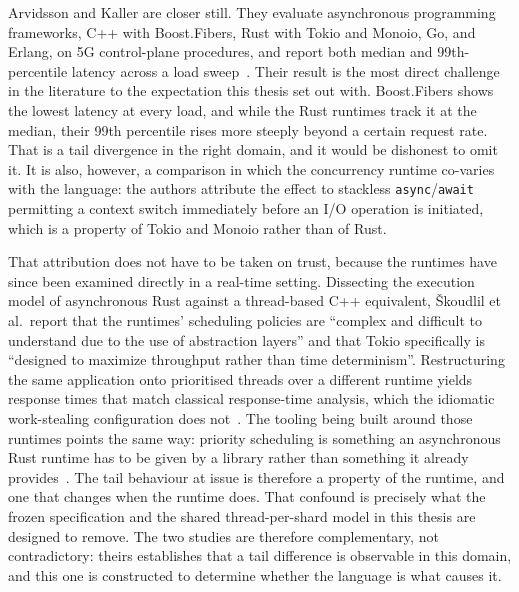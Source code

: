 \documentclass[english,twoside,openright,a4paper,censored,csm,software-track-2020]{HYthesisML}
\begin{document}
Arvidsson and Kaller are closer still. They evaluate asynchronous programming frameworks, C++
with Boost.Fibers, Rust with Tokio and Monoio, Go, and Erlang, on 5G control-plane procedures,
and report both median and 99th-percentile latency across a load
sweep~\cite{arvidsson2025async}. Their result is the most direct challenge in the literature to
the expectation this thesis set out with. Boost.Fibers shows the lowest latency at every load,
and while the Rust runtimes track it at the median, their 99th percentile rises more steeply
beyond a certain request rate. That is a tail divergence in the right domain, and it would be
dishonest to omit it. It is also, however, a comparison in which the concurrency runtime
co-varies with the language: the authors attribute the effect to stackless
\texttt{async}/\texttt{await} permitting a context switch immediately before an I/O operation is
initiated, which is a property of Tokio and Monoio rather than of Rust.

That attribution does not have to be taken on trust, because the runtimes have since been
examined directly in a real-time setting. Dissecting the execution model of asynchronous Rust
against a thread-based C++ equivalent, \v{S}koudlil et al.\ report that the
runtimes' scheduling policies are ``complex and difficult to understand due to the use of
abstraction layers'' and that Tokio specifically is ``designed to maximize throughput rather than
time determinism''. Restructuring the same application onto prioritised threads over a different
runtime yields response times that match classical response-time analysis, which the idiomatic
work-stealing configuration does not~\cite{skoudlil2025asyncrust}. The tooling being built around
those runtimes points the same way: priority scheduling is something an asynchronous Rust runtime
has to be given by a library rather than something it already
provides~\cite{zhuang2026flowprioritize}. The tail behaviour at issue is
therefore a property of the runtime, and one that changes when the runtime does. That confound is
precisely what the frozen specification and the shared thread-per-shard model in this thesis are
designed to remove. The two studies are therefore complementary, not contradictory:
theirs establishes that a tail difference is observable in this domain, and this one is
constructed to determine whether the language is what causes it.
\end{document}
